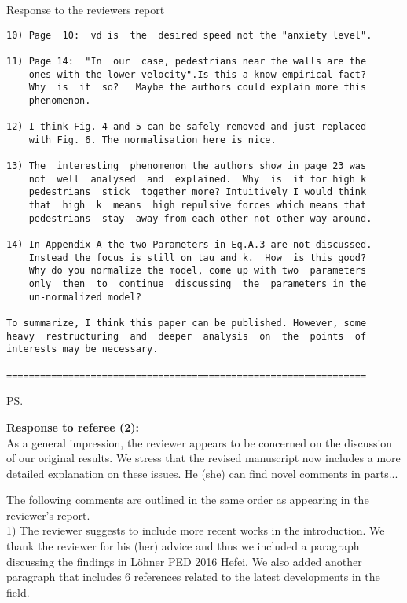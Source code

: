 \documentclass[a4paper,12pt]{letter}
\begin{document}
\begin{letter}{Response to the reviewers report}
\begin{verbatim}
10) Page  10:  vd is  the  desired speed not the "anxiety level".

11) Page 14:  "In  our  case, pedestrians near the walls are the
    ones with the lower velocity".Is this a know empirical fact?
    Why  is  it  so?   Maybe the authors could explain more this
    phenomenon. 

12) I think Fig. 4 and 5 can be safely removed and just replaced 
    with Fig. 6. The normalisation here is nice.

13) The  interesting  phenomenon the authors show in page 23 was
    not  well  analysed  and  explained.  Why  is  it for high k
    pedestrians  stick  together more? Intuitively I would think
    that  high  k  means  high repulsive forces which means that
    pedestrians  stay  away from each other not other way around.

14) In Appendix A the two Parameters in Eq.A.3 are not discussed. 
    Instead the focus is still on tau and k.  How  is this good? 
    Why do you normalize the model, come up with two  parameters
    only  then  to  continue  discussing  the  parameters in the 
    un-normalized model?

To summarize, I think this paper can be published. However, some
heavy  restructuring  and  deeper  analysis  on  the  points  of 
interests may be necessary. 

================================================================

\end{verbatim}


\ps{\textbf{Response to referee (2):} \\

As a general impression, the reviewer appears to be concerned on the discussion of our original results. 
We stress that the revised manuscript now includes a more detailed explanation on these issues. 
He (she) can find novel comments in parts...

The following comments are outlined in the same order as appearing in the
reviewer’s report. \\

1) The reviewer suggests to include more recent works in the introduction. We thank the reviewer for his (her) advice and thus we included a paragraph discussing the findings in L\"ohner PED 2016 Hefei.
We also added another paragraph that includes 6 references related to the latest developments in the field. \\

}
\end{letter}
\end{document}
